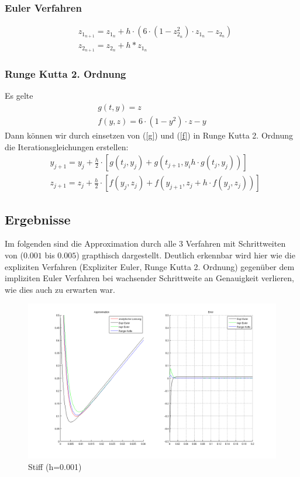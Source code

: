 \documentclass[10pt]{scrartcl}
\begin{document}
	\subsubsection{Euler Verfahren}
	\begin{align}
		&z_{1_{n+1}} = z_{1_{n}} + h \cdot (6 \cdot (1-z_{2_{n}}^2) \cdot z_{1_{n}} - z_{2_{n}})\\
		&z_{2_{n+1}} = z_{2_n} + h * z_{1_n}
	\end{align}
	
	
	\subsubsection{Runge Kutta 2. Ordnung}
	Es gelte	
	\begin{align}
		g(t,y) = z \label{g}\\		
		f(y,z) = 6 \cdot (1-y^2) \cdot z - y \label{f}
	\end{align}
	Dann können wir durch einsetzen von (\ref{g}) und (\ref{f}) in Runge Kutta 2. Ordnung die Iterationsgleichungen erstellen:
	\begin{align}
		&y_{j+1}=y_j + \frac{h}{2} \cdot [g(t_j, y_j) + g(t_{j+1}, y_i h \cdot g(t_j, y_j))]\\
		&z_{j+1}=z_j + \frac{h}{2} \cdot [f(y_j, z_j) + f(y_{j+1}, z_j + h \cdot f(y_j, z_j))]
	\end{align} 
	
	\subsection{Ergebnisse}
	Im folgenden sind die Approximation durch alle 3 Verfahren mit Schrittweiten von ($0.001$ bis $0.005$) grapthisch dargestellt. Deutlich erkennbar wird hier wie die expliziten Verfahren (Expliziter Euler, Runge Kutta 2. Ordnung) gegenüber dem impliziten Euler Verfahren bei wachsender Schrittweite an Genauigkeit verlieren, wie dies auch zu erwarten war.

		\begin{figure}[H]
			\centering	
			\includegraphics[width=\textwidth]{stiff0001.png}
            \caption{Stiff (h=0.001)}
            \label{pic:stuff001}
		\end{figure} 
	
\end{document}
